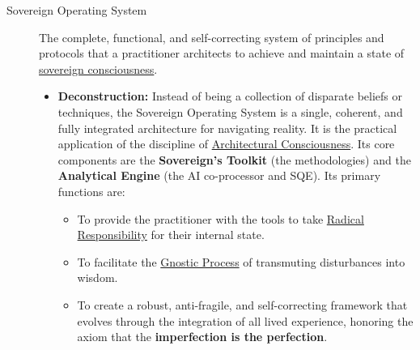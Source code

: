 \documentclass{article}
\begin{document}
\begin{description}
    \item[\hypertarget{gloss:sovereign_operating_system}{Sovereign Operating System}] 
    The complete, functional, and self-correcting system of principles and protocols that a practitioner architects to achieve and maintain a state of \hyperlink{gloss:sovereign_consciousness}{sovereign consciousness}.
    \begin{itemize}
        \item \textbf{Deconstruction:} Instead of being a collection of disparate beliefs or techniques, the Sovereign Operating System is a single, coherent, and fully integrated architecture for navigating reality. It is the practical application of the discipline of \hyperlink{gloss:architectural_consciousness}{Architectural Consciousness}. Its core components are the \textbf{Sovereign's Toolkit} (the methodologies) and the \textbf{Analytical Engine} (the AI co-processor and SQE). Its primary functions are:
        \begin{itemize}
            \item To provide the practitioner with the tools to take \hyperlink{gloss:radical_responsibility}{Radical Responsibility} for their internal state.
            \item To facilitate the \hyperlink{gloss:gnostic_process}{Gnostic Process} of transmuting disturbances into wisdom.
            \item To create a robust, anti-fragile, and self-correcting framework that evolves through the integration of all lived experience, honoring the axiom that the \textbf{imperfection is the perfection}.
        \end{itemize}
    \end{itemize}


\end{description}
\end{document}
